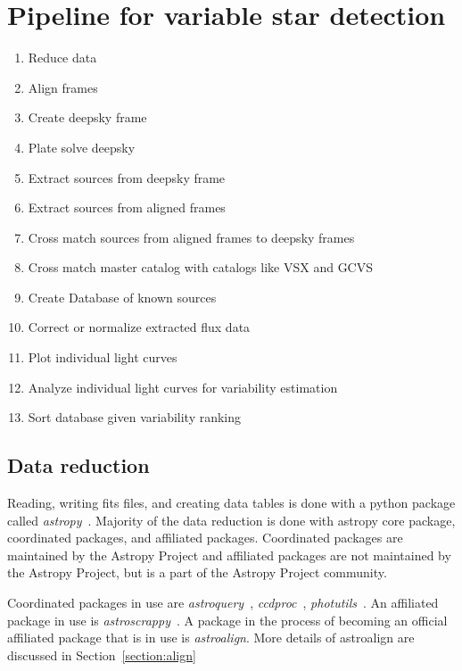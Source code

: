 \section{Pipeline for variable star detection}
\begin{enumerate}
    \item Reduce data
    \item Align frames
    \item Create deepsky frame
    \item Plate solve deepsky
    \item Extract sources from deepsky frame
    \item Extract sources from aligned frames
    \item Cross match sources from aligned frames to deepsky frames
    \item Cross match master catalog with catalogs like VSX and GCVS
    \item Create Database of known sources
    \item Correct or normalize extracted flux data
    \item Plot individual light curves
    \item Analyze individual light curves for variability estimation
    \item Sort database given variability ranking
\end{enumerate}

\subsection{Data reduction}
Reading, writing fits files, and creating data tables is done with a python
package called \textit{astropy}~\cite{astropy_2013,astropy_2018}.
Majority of the data reduction is done with astropy core package,
coordinated packages, and affiliated packages.
Coordinated packages are maintained by the Astropy Project
and affiliated packages are not maintained by the Astropy Project,
but is a part of the Astropy Project community.

Coordinated packages in use are \textit{astroquery}~\cite{astroquery}, \textit{ccdproc}~\cite{ccdproc}, \textit{photutils}~\cite{photutils}.
An affiliated package in use is \textit{astroscrappy}~\cite{astroscrappy}.
A package in the process of becoming an official affiliated package that is in use is \textit{astroalign}. 
More details of astroalign are discussed in Section~\ref{section:align} 

